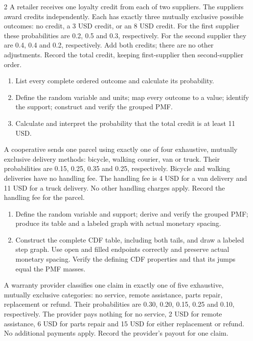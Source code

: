 \begin{multicols*}{2}
\columnbreak
{}
A retailer receives one loyalty credit from each of two suppliers. The suppliers award credits independently. Each has exactly three mutually exclusive possible outcomes: no credit, a 3 USD credit, or an 8 USD credit. For the first supplier these probabilities are 0.2, 0.5 and 0.3, respectively. For the second supplier they are 0.4, 0.4 and 0.2, respectively. Add both credits; there are no other adjustments. Record the total credit, keeping first-supplier then second-supplier order.

\begin{enumerate}[label=(\alph*)]
\item List every complete ordered outcome and calculate its probability. 
\item Define the random variable and units; map every outcome to a value; identify the support; construct and verify the grouped PMF. 
\item Calculate and interpret the probability that the total credit is at least 11 USD. 
\end{enumerate}

A cooperative sends one parcel using exactly one of four exhaustive, mutually exclusive delivery methods: bicycle, walking courier, van or truck. Their probabilities are 0.15, 0.25, 0.35 and 0.25, respectively. Bicycle and walking deliveries have no handling fee. The handling fee is 4 USD for a van delivery and 11 USD for a truck delivery. No other handling charges apply. Record the handling fee for the parcel.

\begin{enumerate}[label=(\alph*)]
\item Define the random variable and support; derive and verify the grouped PMF; produce its table and a labeled graph with actual monetary spacing. 
\item Construct the complete CDF table, including both tails, and draw a labeled step graph. Use open and filled endpoints correctly and preserve actual monetary spacing. Verify the defining CDF properties and that its jumps equal the PMF masses. 
\end{enumerate}

\columnbreak
{}
A warranty provider classifies one claim in exactly one of five exhaustive, mutually exclusive categories: no service, remote assistance, parts repair, replacement or refund. Their probabilities are 0.30, 0.20, 0.15, 0.25 and 0.10, respectively. The provider pays nothing for no service, 2 USD for remote assistance, 6 USD for parts repair and 15 USD for either replacement or refund. No additional payments apply. Record the provider's payout for one claim.


\end{multicols*}
